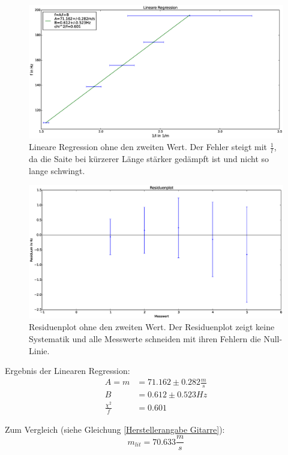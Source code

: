 \documentclass[12pt,a4paper]{article}
\begin{document}
\begin{figure}[H]
\centering
\includegraphics[scale=0.4]{Bilder/lin_reg_ohne.eps}
\caption{Lineare Regression ohne den zweiten Wert. Der Fehler steigt mit $\frac{1}{l}$, da die Saite bei kürzerer Länge stärker gedämpft ist und nicht so lange schwingt.}
\end{figure}


\begin{figure}[H]
\centering
\includegraphics[scale=0.4]{Bilder/lin_reg_ohne_residuum.eps}
\caption{Residuenplot ohne den zweiten Wert. Der Residuenplot zeigt keine Systematik und alle Messwerte schneiden mit ihren Fehlern die Null-Linie.}
\end{figure}

Ergebnis der Linearen Regression:
\begin{align*}
A = m &= 71.162 \pm 0.282 \frac{m}{s}  \\
B &= 0.612 \pm 0.523 Hz \\
\frac{\chi^2}{f}&=0.601
\end{align*}

Zum Vergleich (siehe Gleichung \ref{Herstellerangabe Gitarre}):
\begin{equation}
m_{lit}=70.633 \frac{m}{s}
\end{equation}
\end{document}
